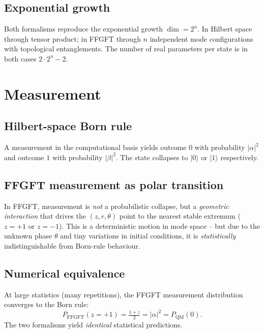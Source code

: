 \subsection{Exponential growth}

Both formalisms reproduce the exponential growth $\dim = 2^n$. In
Hilbert space through tensor product; in FFGFT through $n$
independent mode configurations with topological entanglements. The
number of real parameters per state is in both cases $2 \cdot 2^n - 2$.

\section{Measurement}

\subsection{Hilbert-space Born rule}

A measurement in the computational basis yields outcome $0$ with
probability $|\alpha|^2$ and outcome $1$ with probability $|\beta|^2$.
The state collapses to $|0\rangle$ or $|1\rangle$ respectively.

\subsection{FFGFT measurement as polar transition}

In FFGFT, measurement is \emph{not} a probabilistic collapse, but a
\emph{geometric interaction} that drives the $(z, r, \theta)$ point
to the nearest stable extremum ($z = +1$ or $z = -1$). This is a
deterministic motion in mode space -- but due to the unknown phase
$\theta$ and tiny variations in initial conditions, it is
\emph{statistically} indistinguishable from Born-rule behaviour.

\subsection{Numerical equivalence}

At large statistics (many repetitions), the FFGFT measurement
distribution converges to the Born rule:
\begin{equation}
  P_\text{FFGFT}(z = +1) = \tfrac{1+z}{2} = |\alpha|^2 = P_\text{QM}(0).
\end{equation}
The two formalisms yield \emph{identical} statistical predictions.

